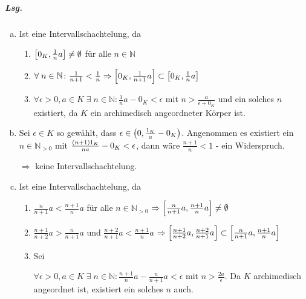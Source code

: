 \documentclass{scrreprt}
\begin{document}
\subparagraph{Lsg.}
\begin{enumerate}[(a)]
\item Ist eine Intervallschachtelung, da
  \begin{enumerate}[(1)]
  \item $\qty[0_K, \frac{1}{n}a] \ne \emptyset$ für alle $n \in \mathbb{N}$
  \item $\forall \; n \in \mathbb{N} \colon
    \frac{1}{n + 1} < \frac{1}{n}
    \Rightarrow \qty[0_K, \frac{1}{n + 1}a] \subset \qty[0_K, \frac{1}{n}a]$

  \item $\forall \epsilon > 0, a \in K \; \exists \; n \in \mathbb{N}
    \colon \frac{1}{n}a - 0_K< \epsilon$ mit $n > \frac{a}{\epsilon + 0_K}$
    und ein solches $n$ existiert, da $K$ ein archimedisch angeordneter Körper
    ist.
  \end{enumerate}

\newpage
\item Sei $\epsilon \in K$ so gewählt, dass
  $\epsilon \in \qty(0, \frac{1_K}{a} - 0_K)$.
  Angenommen es existiert ein $n \in \mathbb{N}_{> 0}$ mit
  $\frac{\qty(n + 1)1_K}{na} - 0_K < \epsilon$, dann wäre
  $\frac{n + 1}{n} < 1$ - ein Widerspruch.

  $\Rightarrow$ keine Intervallschachtelung.

\item Ist eine Intervallschachtelung, da
  \begin{enumerate}[(1)]
  \item $\frac{n}{n + 1}a < \frac{n + 1}{n}a$ für alle $n \in \mathbb{N}_{> 0}$
    $\Rightarrow \qty[\frac{n}{n + 1}a, \frac{n + 1}{n} a] \ne \emptyset$

  \item $\frac{n + 1}{n + 2}a > \frac{n}{n + 1}a$ und
    $\frac{n + 2}{n + 1}a < \frac{n + 1}{n}a$
    $\Rightarrow \qty[\frac{n + 1}{n + 2}a, \frac{n + 2}{n + 1} a]
    \subset \qty[\frac{n}{n + 1}a, \frac{n + 1}{n} a]$

  \item Sei
    \begin{scriptsize}
    \end{scriptsize}

    $\forall \epsilon > 0, a \in K \; \exists \; n \in \mathbb{N}
    \colon \frac{n + 1}{n}a - \frac{n}{n + 1}a < \epsilon$ mit
    $n > \frac{2a}{\epsilon}$.
    Da $K$ archimedisch angeordnet ist, existiert ein solches $n$ auch.
  \end{enumerate}
\end{enumerate}
\end{document}
